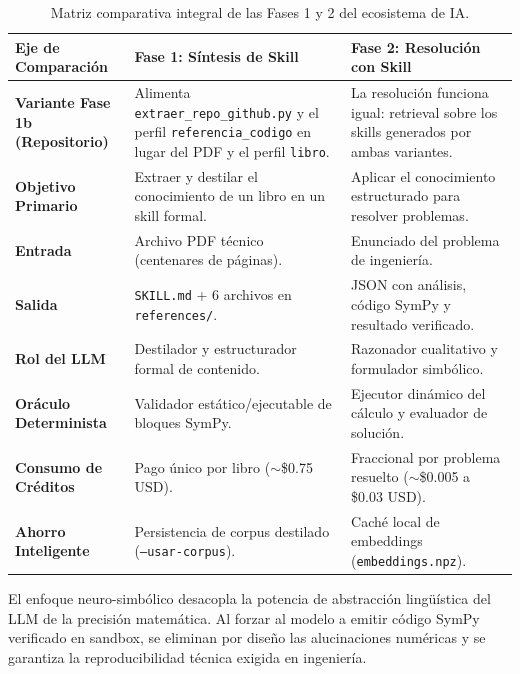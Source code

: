 \documentclass[11pt,a4paper]{article}
\begin{document}
\begin{table}[h!]
\centering
\small
\begin{tabularx}{\linewidth}{>{\bfseries\color{azulNoche}}l >{\raggedright\arraybackslash}X >{\raggedright\arraybackslash}X}
\toprule
\rowcolor{azulNoche!12}\textbf{Eje de Comparación} & \textbf{Fase 1: Síntesis de Skill} & \textbf{Fase 2: Resolución con Skill} \\
\midrule
\textbf{Variante Fase 1b (Repositorio)} & Alimenta \texttt{extraer\_repo\_github.py} y el perfil \texttt{referencia\_codigo} en lugar del PDF y el perfil \texttt{libro}. & La resolución funciona igual: retrieval sobre los skills generados por ambas variantes. \\
\midrule
\textbf{Objetivo Primario} & Extraer y destilar el conocimiento de un libro en un skill formal. & Aplicar el conocimiento estructurado para resolver problemas. \\
\midrule
\textbf{Entrada} & Archivo PDF técnico (centenares de páginas). & Enunciado del problema de ingeniería. \\
\midrule
\textbf{Salida} & \texttt{SKILL.md} + 6 archivos en \texttt{references/}. & JSON con análisis, código SymPy y resultado verificado. \\
\midrule
\textbf{Rol del LLM} & Destilador y estructurador formal de contenido. & Razonador cualitativo y formulador simbólico. \\
\midrule
\textbf{Oráculo Determinista} & Validador estático/ejecutable de bloques SymPy. & Ejecutor dinámico del cálculo y evaluador de solución. \\
\midrule
\textbf{Consumo de Créditos} & Pago único por libro ($\sim$\$0.75 USD). & Fraccional por problema resuelto ($\sim$\$0.005 a \$0.03 USD). \\
\midrule
\textbf{Ahorro Inteligente} & Persistencia de corpus destilado (\texttt{--usar-corpus}). & Caché local de embeddings (\texttt{embeddings.npz}). \\
\bottomrule
\end{tabularx}
\caption{Matriz comparativa integral de las Fases 1 y 2 del ecosistema de IA.}
\end{table}

\begin{cajaRecuerda}
El enfoque neuro-simbólico desacopla la potencia de abstracción lingüística del LLM de la precisión matemática. Al forzar al modelo a emitir código SymPy verificado en sandbox, se eliminan por diseño las alucinaciones numéricas y se garantiza la reproducibilidad técnica exigida en ingeniería.
\end{cajaRecuerda}
\end{document}

